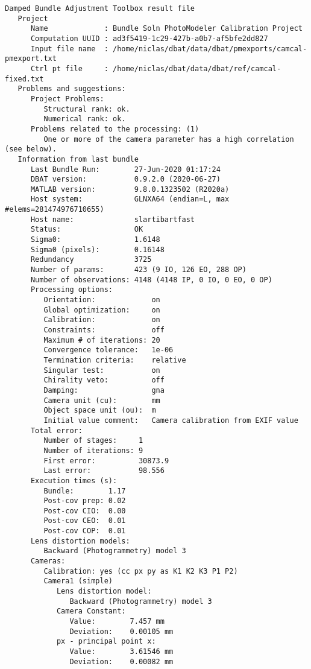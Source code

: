 \documentclass{article}
\begin{document}
\begin{verbatim}
Damped Bundle Adjustment Toolbox result file
   Project
      Name             : Bundle Soln PhotoModeler Calibration Project
      Computation UUID : ad3f5419-1c29-427b-a0b7-af5bfe2dd827
      Input file name  : /home/niclas/dbat/data/dbat/pmexports/camcal-pmexport.txt
      Ctrl pt file     : /home/niclas/dbat/data/dbat/ref/camcal-fixed.txt
   Problems and suggestions:
      Project Problems:
         Structural rank: ok.
         Numerical rank: ok.
      Problems related to the processing: (1)
         One or more of the camera parameter has a high correlation (see below).
   Information from last bundle
      Last Bundle Run:        27-Jun-2020 01:17:24
      DBAT version:           0.9.2.0 (2020-06-27)
      MATLAB version:         9.8.0.1323502 (R2020a)
      Host system:            GLNXA64 (endian=L, max #elems=281474976710655)
      Host name:              slartibartfast
      Status:                 OK
      Sigma0:                 1.6148
      Sigma0 (pixels):        0.16148
      Redundancy              3725
      Number of params:       423 (9 IO, 126 EO, 288 OP)
      Number of observations: 4148 (4148 IP, 0 IO, 0 EO, 0 OP)
      Processing options:
         Orientation:             on
         Global optimization:     on
         Calibration:             on
         Constraints:             off
         Maximum # of iterations: 20
         Convergence tolerance:   1e-06
         Termination criteria:    relative
         Singular test:           on
         Chirality veto:          off
         Damping:                 gna
         Camera unit (cu):        mm
         Object space unit (ou):  m
         Initial value comment:   Camera calibration from EXIF value
      Total error:
         Number of stages:     1
         Number of iterations: 9
         First error:          30873.9
         Last error:           98.556
      Execution times (s):
         Bundle:        1.17
         Post-cov prep: 0.02
         Post-cov CIO:  0.00
         Post-cov CEO:  0.01
         Post-cov COP:  0.01
      Lens distortion models:
         Backward (Photogrammetry) model 3
      Cameras:
         Calibration: yes (cc px py as K1 K2 K3 P1 P2)
         Camera1 (simple)
            Lens distortion model:
               Backward (Photogrammetry) model 3
            Camera Constant:
               Value:        7.457 mm
               Deviation:    0.00105 mm
            px - principal point x:
               Value:        3.61546 mm
               Deviation:    0.00082 mm

\end{verbatim}
\end{document}
